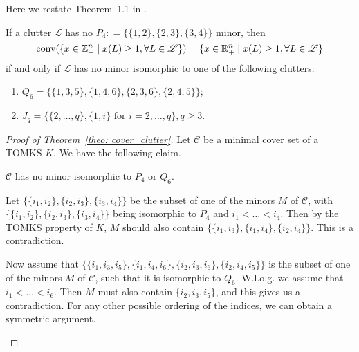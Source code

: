 \begin{appendices}
Here we restate Theorem~1.1 in \cite{laurent1992characterization}.
\begin{theorem}
\label{theo: seymour}
If a clutter $\mathscr{L}$ has no $P_4: = \{\{1,2\}, \{2,3\}, \{3,4\}\}$ minor, then 
$$\operatorname{conv}(\{x \in \mathbb{Z}^n_+ \mid x(L) \geq 1, \forall L \in \mathscr{L}\}) = \{x \in \mathbb{R}^n_+ \mid x(L) \geq 1, \forall L \in \mathscr{L}\}$$ 
if and only if $\mathscr{L}$ has no minor isomorphic to one of the following clutters:
\begin{enumerate}
\item $Q_6 = \{\{1,3,5\}, \{1,4,6\}, \{2,3,6\}, \{2,4,5\}\}$;
\item $J_q = \{\{2, \ldots, q\}, \{1, i\} \text{ for } i = 2, \ldots, q\}, q \geq 3$.
\end{enumerate}
\end{theorem}

\begin{proof}[Proof of Theorem~\ref{theo: cover_clutter}]
Let $\mathcal C$ be a minimal cover set of a TOMKS $K$.
We have the following claim.
\begin{claim}
\label{claim this one}
$\mathcal C$ has no minor isomorphic to $P_4$ or $Q_6$.
\end{claim}
\begin{cpf}
Let $\{\{i_1, i_2\}, \{i_2, i_3\}, \{i_3, i_4\}\}$ be the subset of one of the minors $M$ of $\mathcal C$, with $\{\{i_1, i_2\}, \{i_2, i_3\}, \{i_3, i_4\}\}$ being isomorphic to $P_4$ and $i_1 < \ldots < i_4$. Then by the TOMKS property of $K$, $M$ should also contain $\{\{i_1, i_3\}, \{i_1, i_4\}, \{i_2, i_4\}\}$. This is a contradiction.

Now assume that $\{\{i_1, i_3, i_5\}, \{i_1, i_4, i_6\}, \{i_2, i_3, i_6\}, \{i_2, i_4, i_5\}\}$ is the subset of one of the minors $M$ of $\mathcal C$, such that it is isomorphic to $Q_6$.
W.l.o.g. we assume that $i_1 < \ldots < i_6$. 
Then $M$ must also contain $\{i_2, i_3, i_5\}$, and this gives us a contradiction. 
For any other possible ordering of the indices, we can obtain a symmetric argument. 
\end{cpf}


\end{proof}
\end{appendices}

